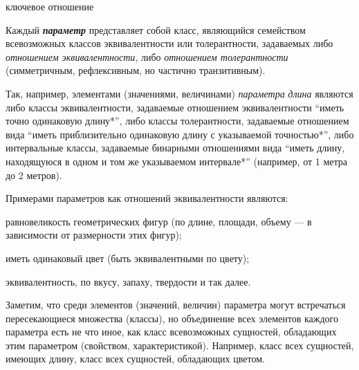 \begin{SCn}
\begin{SCn}
\begin{SCn}
\begin{scnrelfromlist}{ключевое отношение}
\end{scnrelfromlist}
\end{SCn}

Каждый \textbf{\textit{параметр}} представляет собой класс, являющийся семейством всевозможных классов эквивалентности или толерантности, задаваемых либо \textit{отношением эквивалентности}, либо \textit{отношением толерантности} (симметричным, рефлексивным, но частично транзитивным).

Так, например, элементами (значениями, величинами) \textit{параметра} \textit{длина} являются либо классы эквивалентности, задаваемые отношением эквивалентности ``иметь точно одинаковую длину*'', либо классы толерантности, задаваемые отношением вида ``иметь приблизительно одинаковую длину с указываемой точностью*'', либо интервальные классы, задаваемые бинарными отношениями вида ``иметь длину, находящуюся в одном и том же указываемом интервале*'' (например, от 1 метра до 2 метров).

Примерами параметров как отношений эквивалентности являются:

\begin{textitemize}
	\item равновеликость геометрических фигур (по длине, площади, объему --- в зависимости от размерности этих фигур);
	\item иметь одинаковый цвет (быть эквивалентными по цвету);
	\item эквивалентность, по вкусу, запаху, твердости и так далее.
\end{textitemize}

Заметим, что среди элементов (значений, величин) параметра могут встречаться пересекающиеся множества (классы), но объединение всех элементов каждого параметра есть не что иное, как класс всевозможных сущностей, обладающих этим параметром (свойством, характеристикой). Например, класс всех сущностей, имеющих длину, класс всех сущностей, обладающих цветом.

\begin{SCn}
\begin{scnsubdividing}
\end{scnsubdividing}
\end{SCn}
		

\end{SCn}
\end{SCn}
